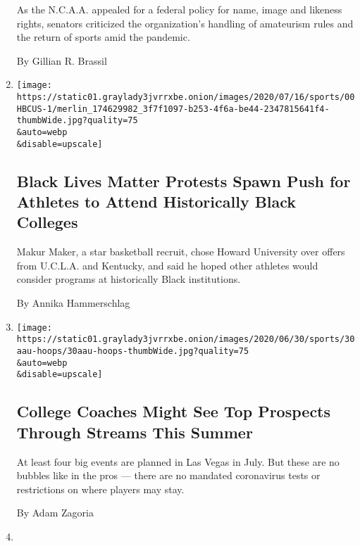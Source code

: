 \begin{enumerate}
  As the N.C.A.A. appealed for a federal policy for name, image and
  likeness rights, senators criticized the organization's handling of
  amateurism rules and the return of sports amid the pandemic.

  By Gillian R. Brassil
\item
  \href{/2020/07/22/sports/ncaabasketball/black-lives-matter-hbcus-college-athletes.html}{}

  \texttt{[image: https://static01.graylady3jvrrxbe.onion/images/2020/07/16/sports/00HBCUS-1/merlin\_174629982\_3f7f1097-b253-4f6a-be44-2347815641f4-thumbWide.jpg?quality=75\\\&auto=webp\\\&disable=upscale]}

  \hypertarget{black-lives-matter-protests-spawn-push-for-athletes-to-attend-historically-black-colleges}{%
  \subsection{Black Lives Matter Protests Spawn Push for Athletes to
  Attend Historically Black
  Colleges}\label{black-lives-matter-protests-spawn-push-for-athletes-to-attend-historically-black-colleges}}

  Makur Maker, a star basketball recruit, chose Howard University over
  offers from U.C.L.A. and Kentucky, and said he hoped other athletes
  would consider programs at historically Black institutions.

  By Annika Hammerschlag
\item
  \href{/2020/06/30/sports/ncaabasketball/coronavirus-aau-basketball-las-vegas.html}{}

  \texttt{[image: https://static01.graylady3jvrrxbe.onion/images/2020/06/30/sports/30aau-hoops/30aau-hoops-thumbWide.jpg?quality=75\\\&auto=webp\\\&disable=upscale]}

  \hypertarget{college-coaches-might-see-top-prospects-through-streams-this-summer}{%
  \subsection{College Coaches Might See Top Prospects Through Streams
  This
  Summer}\label{college-coaches-might-see-top-prospects-through-streams-this-summer}}

  At least four big events are planned in Las Vegas in July. But these
  are no bubbles like in the pros --- there are no mandated coronavirus
  tests or restrictions on where players may stay.

  By Adam Zagoria
\item
  \href{/2020/06/23/sports/ncaabasketball/cade-cunningham-oklahoma-state.html}{}


\end{enumerate}

